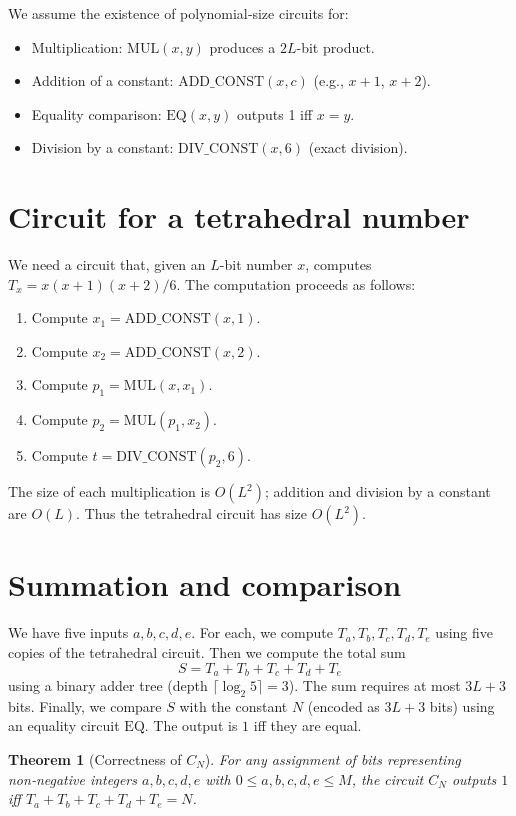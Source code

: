 \documentclass[11pt,a4paper]{article}
\newtheorem{theorem}{Theorem}[section]
\begin{document}
We assume the existence of polynomial‑size circuits for:
\begin{itemize}
\item Multiplication: \(\mathrm{MUL}(x,y)\) produces a \(2L\)-bit product.
\item Addition of a constant: \(\mathrm{ADD\_CONST}(x,c)\) (e.g., \(x+1\), \(x+2\)).
\item Equality comparison: \(\mathrm{EQ}(x,y)\) outputs 1 iff \(x=y\).
\item Division by a constant: \(\mathrm{DIV\_CONST}(x,6)\) (exact division).
\end{itemize}

\section{Circuit for a tetrahedral number}

We need a circuit that, given an \(L\)-bit number \(x\), computes \(T_x = x(x+1)(x+2)/6\). The computation proceeds as follows:
\begin{enumerate}
\item Compute \(x_1 = \mathrm{ADD\_CONST}(x, 1)\).
\item Compute \(x_2 = \mathrm{ADD\_CONST}(x, 2)\).
\item Compute \(p_1 = \mathrm{MUL}(x, x_1)\).
\item Compute \(p_2 = \mathrm{MUL}(p_1, x_2)\).
\item Compute \(t = \mathrm{DIV\_CONST}(p_2, 6)\).
\end{enumerate}
The size of each multiplication is \(O(L^2)\); addition and division by a constant are \(O(L)\). Thus the tetrahedral circuit has size \(O(L^2)\).

\section{Summation and comparison}

We have five inputs \(a,b,c,d,e\). For each, we compute \(T_a, T_b, T_c, T_d, T_e\) using five copies of the tetrahedral circuit. Then we compute the total sum
\[
S = T_a + T_b + T_c + T_d + T_e
\]
using a binary adder tree (depth \(\lceil \log_2 5\rceil = 3\)). The sum requires at most \(3L+3\) bits. Finally, we compare \(S\) with the constant \(N\) (encoded as \(3L+3\) bits) using an equality circuit \(\mathrm{EQ}\). The output is \(1\) iff they are equal.

\begin{theorem}[Correctness of \(C_N\)]
For any assignment of bits representing non‑negative integers \(a,b,c,d,e\) with \(0\le a,b,c,d,e \le M\), the circuit \(C_N\) outputs \(1\) iff \(T_a+T_b+T_c+T_d+T_e = N\).
\end{theorem}
\end{document}
